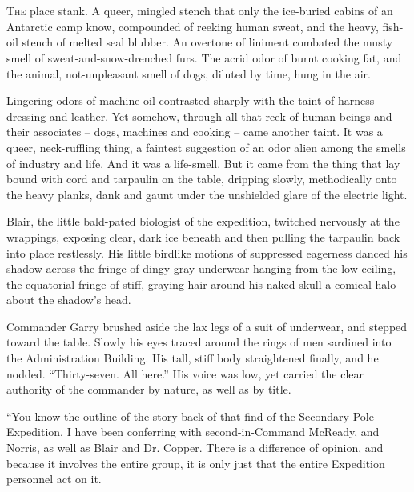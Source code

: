 \documentclass[letterpaper,openany,12pt]{memoir}		%
\begin{document}
\clearpage
\tableofcontents*

\mainmatter
\pagestyle{fancy}

\chapter[Chapter 1]{}

\lettrine[lines=3,findent=3pt,nindent=2pt]{T}{he} place stank. A queer, mingled
stench that only the ice-buried cabins of an Antarctic camp know, compounded of
reeking human sweat, and the heavy, fish-oil stench of melted seal blubber. An
overtone of liniment combated the musty smell of sweat-and-snow-drenched furs.
The acrid odor of burnt cooking fat, and the animal, not-unpleasant smell of
dogs, diluted by time, hung in the air.

Lingering odors of machine oil contrasted sharply with the taint of harness
dressing and leather. Yet somehow, through all that reek of human beings and
their associates -- dogs, machines and cooking -- came another taint. It was a
queer, neck-ruffling thing, a faintest suggestion of an odor alien among the
smells of industry and life. And it was a life-smell. But it came from the thing
that lay bound with cord and tarpaulin on the table, dripping slowly,
methodically onto the heavy planks, dank and gaunt under the unshielded glare of
the electric light.

Blair, the little bald-pated biologist of the expedition, twitched nervously at
the wrappings, exposing clear, dark ice beneath and then pulling the tarpaulin
back into place restlessly. His little birdlike motions of suppressed eagerness
danced his shadow across the fringe of dingy gray underwear hanging from the low
ceiling, the equatorial fringe of stiff, graying hair around his naked skull a
comical halo about the shadow's head.

Commander Garry brushed aside the lax legs of a suit of underwear, and stepped
toward the table. Slowly his eyes traced around the rings of men sardined into
the Administration Building. His tall, stiff body straightened finally, and he
nodded. ``Thirty-seven. All here.'' His voice was low, yet carried the clear
authority of the commander by nature, as well as by title.

``You know the outline of the story back of that find of the Secondary Pole
Expedition. I have been conferring with second-in-Command McReady, and Norris,
as well as Blair and Dr. Copper. There is a difference of opinion, and because
it involves the entire group, it is only just that the entire Expedition
personnel act on it.
\end{document}
